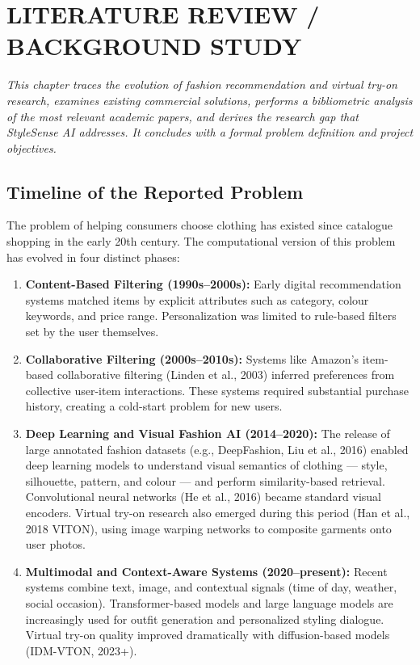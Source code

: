 \documentclass[12pt,a4paper]{report}
\newcommand{\ProjectShort}{StyleSense AI}
\begin{document}
\chapter{LITERATURE REVIEW / BACKGROUND STUDY}

\textit{This chapter traces the evolution of fashion recommendation and virtual try-on research, examines existing commercial solutions, performs a bibliometric analysis of the most relevant academic papers, and derives the research gap that \ProjectShort{} addresses. It concludes with a formal problem definition and project objectives.}

\section{Timeline of the Reported Problem}

The problem of helping consumers choose clothing has existed since catalogue shopping in the early 20th century. The computational version of this problem has evolved in four distinct phases:

\begin{enumerate}
  \item \textbf{Content-Based Filtering (1990s--2000s):} Early digital recommendation systems matched items by explicit attributes such as category, colour keywords, and price range. Personalization was limited to rule-based filters set by the user themselves.
  \item \textbf{Collaborative Filtering (2000s--2010s):} Systems like Amazon's item-based collaborative filtering (Linden et al., 2003) inferred preferences from collective user-item interactions. These systems required substantial purchase history, creating a cold-start problem for new users.
  \item \textbf{Deep Learning and Visual Fashion AI (2014--2020):} The release of large annotated fashion datasets (e.g., DeepFashion, Liu et al., 2016) enabled deep learning models to understand visual semantics of clothing --- style, silhouette, pattern, and colour --- and perform similarity-based retrieval. Convolutional neural networks (He et al., 2016) became standard visual encoders. Virtual try-on research also emerged during this period (Han et al., 2018 VITON), using image warping networks to composite garments onto user photos.
  \item \textbf{Multimodal and Context-Aware Systems (2020--present):} Recent systems combine text, image, and contextual signals (time of day, weather, social occasion). Transformer-based models and large language models are increasingly used for outfit generation and personalized styling dialogue. Virtual try-on quality improved dramatically with diffusion-based models (IDM-VTON, 2023+).
\end{enumerate}
\end{document}
